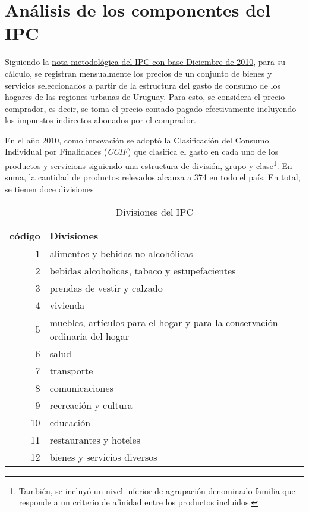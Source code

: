 \documentclass[12pt]{article}
\begin{document}
\section{Análisis de los componentes del IPC}


Siguiendo la \href{https://www5.ine.gub.uy/documents/Estad%C3%ADsticasecon%C3%B3micas/PDF/IPC/IPC%20NOTA%20METODOLOGICA%20BASE%202010.pdf}{nota metodológica del IPC con base Diciembre de 2010}, para su cálculo, se registran mensualmente los precios de un conjunto de bienes y servicios seleccionados a partir de la estructura del gasto de consumo de los hogares de las regiones urbanas de Uruguay. Para esto, se considera el precio comprador, es decir, se toma el precio contado pagado efectivamente incluyendo los impuestos indirectos abonados por el comprador.  

En el año 2010, como innovación se adoptó la Clasificación del Consumo Individual por Finalidades (\textit{CCIF}) que clasifica el
gasto en cada uno de los productos y servicions siguiendo una estructura de división, grupo y clase\footnote{También, se incluyó un nivel inferior de agrupación  denominado familia que
responde a un criterio de afinidad entre los productos incluidos.}. En suma, la cantidad de productos relevados alcanza a 374 en todo el país. En total, se tienen doce divisiones 

\begin{table}[h!] %
\centering
\caption{Divisiones del IPC}
\label{tab:div}
\begin{tabular}{r m{12cm}}
\toprule
código & Divisiones \\
\midrule
1 & alimentos y bebidas no alcohólicas \\
2 & bebidas alcoholicas, tabaco y estupefacientes \\
3 & prendas de vestir y calzado \\
4 & vivienda \\
5 & muebles, artículos para el hogar y para la conservación ordinaria del hogar \\
6 & salud \\
7 & transporte \\
8 & comunicaciones \\
9 & recreación y cultura \\
10 & educación \\
11 & restaurantes y hoteles \\
12 & bienes y servicios diversos \\
\bottomrule
\end{tabular}
\end{table}
\end{document}
